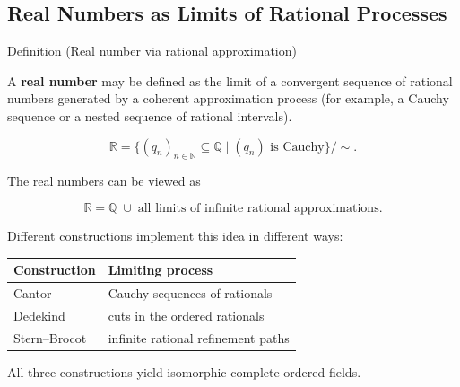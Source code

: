 \subsection*{Real Numbers as Limits of Rational Processes}

\begin{definitionbox}{Definition (Real number via rational approximation)}
\label{def:real-limit-approx}

A \textbf{real number} may be defined as the limit of a convergent
sequence of rational numbers generated by a coherent approximation
process (for example, a Cauchy sequence or a nested sequence of
rational intervals).

\end{definitionbox}

\begin{remark*}

\[
\mathbb{R}
=
\{ (q_n)_{n\in\mathbb{N}} \subseteq \mathbb{Q}
\mid (q_n) \text{ is Cauchy} \} / \sim .
\]

\end{remark*}

\begin{remark*}

The real numbers can be viewed as

\[
\boxed{
\mathbb{R}
=
\mathbb{Q}
\;\cup\;
\text{all limits of infinite rational approximations}.
}
\]

Different constructions implement this idea in different ways:

\begin{center}
\begin{tabular}{l l}
\toprule
Construction & Limiting process \\
\midrule
Cantor & Cauchy sequences of rationals \\
Dedekind & cuts in the ordered rationals \\
Stern–Brocot & infinite rational refinement paths \\
\bottomrule
\end{tabular}
\end{center}

All three constructions yield isomorphic complete ordered fields.

\end{remark*}
